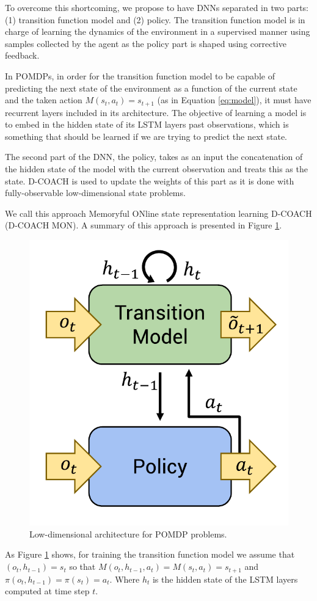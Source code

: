 To overcome this shortcoming, we propose to have DNNs separated in two parts: (1) transition function model and (2) policy. The transition function model is in charge of learning the dynamics of the environment in a supervised manner using samples collected by the agent as the policy part is shaped using corrective feedback. 

In POMDPs, in order for the transition function model to be capable of predicting the next state of the environment as a function of the current state and the taken action $M(s_{t},a_{t}) = s_{t+1}$ (as in Equation \ref{eq:model}), it must have recurrent layers included in its architecture. The objective of learning a model is to embed in the hidden state of its LSTM layers past observations, which is something that should be learned if we are trying to predict the next state. 

The second part of the DNN, the policy, takes as an input the concatenation of the hidden state of the model with the current observation and treats this as the state. D-COACH is used to update the weights of this part as it is done with fully-observable low-dimensional state problems.

We call this approach Memoryful ONline state representation learning D-COACH (D-COACH MON). A summary of this approach is presented in Figure \ref{fig:mb_dcoach}.

\begin{figure}[h]
    \centering
    \includegraphics[width=0.4\linewidth]{imagenes/cap4/model_based_dcoach.pdf}
    \caption{Low-dimensional architecture for POMDP problems.}
    \label{fig:mb_dcoach}
\end{figure}

As Figure \ref{fig:mb_dcoach} shows, for training the transition function model we assume that $(o_{t}, h_{t-1}) = s_{t}$ so that $M(o_{t}, h_{t-1},a_{t}) =M(s_{t},a_{t}) = s_{t+1}$ and $\pi(o_{t}, h_{t-1})=\pi(s_{t})=a_{t}$. Where $h_{t}$ is the hidden state of the LSTM layers computed at time step $t$.

